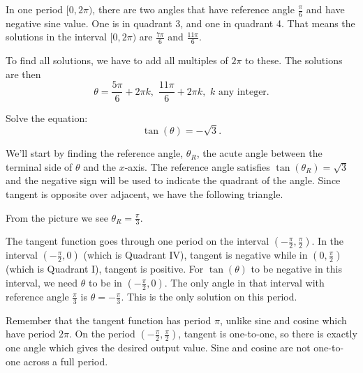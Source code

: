 \documentclass[nooutcomes]{ximera}
\begin{document}
\begin{example}
\begin{explanation}
In one period $[0, 2\pi)$, there are two angles that have reference angle $\frac{\pi}{6}$ and have negative
		sine value.  One is in quadrant 3, and one in quadrant 4.  That means the solutions in the interval $[0, 2\pi)$ are $\frac{7\pi}{6}$ and $\frac{11\pi}{6}$.
		
		To find all solutions, we have to add all multiples of $2\pi$ to these.  The solutions are then $$ \theta = \frac{5\pi}{6} + 2\pi k , \,\, \frac{11\pi}{6}+2\pi k , \,\, k \textrm{ any integer}. $$
	\end{explanation}
\end{example}

\begin{example}
	Solve the equation: \[ \tan(\theta) = -\sqrt{3}. \]

	\begin{explanation}
		We'll start by finding the reference angle, $\theta_R$, the acute angle between the terminal side of $\theta$ and the $x$-axis.  
		The reference angle satisfies $\tan(\theta_R) = \sqrt{3}$ and the negative sign will be used to indicate the quadrant of the angle.
		Since tangent is opposite over adjacent, we have the following triangle.
		\begin{image}[2in]
		\end{image}
		From the picture we see $\theta_R = \frac{\pi}{3}$.		
	
		The tangent function goes through one period on the interval $\left( -\frac{\pi}{2}, \frac{\pi}{2}\right)$. In the interval $\left( -\frac{\pi}{2}, 0\right)$ 
		(which is Quadrant IV), tangent is negative while in $\left( 0, \frac{\pi}{2}\right)$ (which is Quadrant I), tangent is positive.
		For $\tan(\theta)$ to be negative in this interval, we need $\theta$ to be in $\left( -\frac{\pi}{2}, 0\right)$. The only angle in
		that interval with reference angle $\frac{\pi}{3}$ is $\theta = -\frac{\pi}{3}$. This is the only solution on this period.
		\begin{callout}
			Remember that the tangent function has period $\pi$, unlike sine and cosine which have period $2\pi$. On the period
			$\left( -\frac{\pi}{2}, \frac{\pi}{2}\right)$, tangent is one-to-one, so there is exactly one angle which gives the desired
			output value. Sine and cosine are not one-to-one across a full period.
		\end{callout}
		

\end{explanation}
\end{example}
\end{document}
